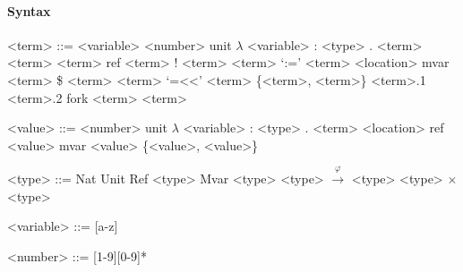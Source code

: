 \documentclass[10pt]{article}
\newcommand{\xto}{\xrightarrow}
\theoremstyle{definition}\newtheorem*{theorem}{Theorem}
\theoremstyle{definition}\newtheorem*{definition}{Definition}
\theoremstyle{definition}\newtheorem*{lemma}{Lemma}
\begin{document}
    \paragraph{Syntax}
    \setlength{\grammarindent}{8em} %
    \begin{grammar}
        <term> ::= <variable> 
        \vspace{0.8em}
        \alt <number>
        \vspace{0.8em}
        \alt unit
        \vspace{0.8em}
        \alt $\lambda$ <variable> : <type> . <term>
        \vspace{0.8em}
        \alt <term> <term>
        \vspace{0.8em}
        \alt ref <term> 
        \vspace{0.8em}
        \alt ! <term>
        \vspace{0.8em}
        \alt <term> `:=' <term>
        \vspace{0.8em}
        \alt <location>
        \vspace{0.8em}
        \alt mvar <term> 
        \vspace{0.8em}
        \alt \$ <term>
        \vspace{0.8em}
        \alt <term> `=<<' <term>
        \vspace{0.8em}
        \alt \{\;<term>, <term>\;\}
        \vspace{0.8em}
        \alt <term>.1
        \vspace{0.8em}
        \alt <term>.2
        \vspace{0.8em}
        \alt fork <term> <term>

        <value> ::= <number>
        \vspace{0.8em}
        \alt unit
        \vspace{0.8em}
        \alt $\lambda$ <variable> : <type> . <term>
        \vspace{0.8em}
        \alt <location>
        \vspace{0.8em}
        \alt ref <value>
        \vspace{0.8em}
        \alt mvar <value>
        \vspace{0.8em}
        \alt \{\;<value>, <value>\;\}

        <type> ::= Nat
        \vspace{0.8em}
        \alt Unit
        \vspace{0.8em}
        \alt Ref <type>
        \vspace{0.8em}
        \alt Mvar <type>
        \vspace{0.8em}
        \alt <type> $\xto{\varphi}$ <type>
        \vspace{0.8em}
        \alt <type> $\times$ <type>

        <variable> ::= [a-z]

        <number> ::= [1-9][0-9]*
    \end{grammar}
\end{document}
